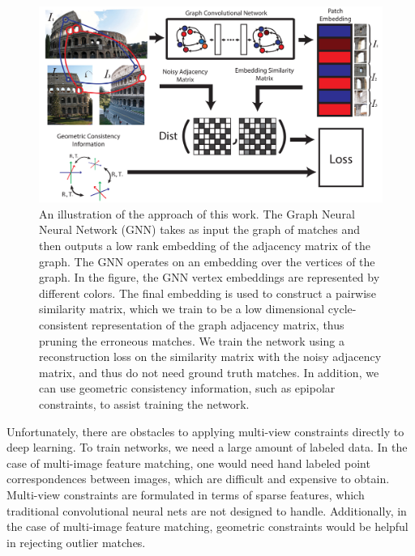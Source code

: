 \documentclass[10pt,twocolumn,letterpaper]{article}
\begin{document}
\begin{figure}[t]
\begin{center}
  \includegraphics[width=0.8\linewidth]{figures-CycleConsistencyMainFigure-v2.pdf}
\end{center}
  \caption{
    An illustration of the approach of this work.
    The Graph Neural Neural Network (GNN) \cite{battaglia2018relational} takes as input the graph of matches and then outputs a low rank embedding of the adjacency matrix of the graph.
    The GNN operates on an embedding over the vertices of the graph.
    In the figure, the GNN vertex embeddings are represented by different colors.
    The final embedding is used to construct a pairwise similarity matrix, which we train to be a low dimensional cycle-consistent representation of the graph adjacency matrix, thus pruning the erroneous matches.
    We train the network using a reconstruction loss on the similarity matrix with the noisy adjacency matrix, and thus do not need ground truth matches.
    In addition, we can use geometric consistency information, such as epipolar constraints, to assist training the network.
  }
\label{fig:pipeline}
\label{fig:onecol}
\end{figure}

Unfortunately, there are obstacles to applying multi-view constraints directly to deep learning. 
To train networks, we need a large amount of labeled data.
In the case of multi-image feature matching, one would need hand labeled point correspondences between images, which are difficult and expensive to obtain.
Multi-view constraints are formulated in terms of sparse features, which traditional convolutional neural nets are not designed to handle.
Additionally, in the case of multi-image feature matching, geometric constraints would be helpful in rejecting outlier matches.
\end{document}
